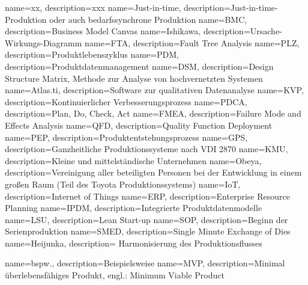 %
{
  name=xx, 
  description={xxx}
}
%
%
{
  name=Just-in-time, 
  description={Just-in-time-Produktion oder auch bedarfssynchrone Produktion}
}
%
%
{
  name=BMC, 
  description={Business Model Canvas}
}
%
%
{
  name=Ishikawa, 
  description={Ursache-Wirkungs-Diagramm}
}
%
%
{
  name=FTA, 
  description={Fault Tree Analysis}
}
%
%
{
  name=PLZ, 
  description={Produktlebenszyklus}
}
%
%
{
  name=PDM, 
  description={Produktdatenmanagement}
}
%
%
{
  name=DSM, 
  description={Design Structure Matrix, Methode zur Analyse von hochvernetzten Systemen}
}
%
%
{
  name=Atlas.ti, 
  description={Software zur qualitativen Datenanalyse}
}
%
%
{
  name=KVP, 
  description={Kontinuierlicher Verbesserungsprozess}
}
%
%
{
  name=PDCA, 
  description={Plan, Do, Check, Act}
}
%
%
{
  name=FMEA, 
  description={Failure Mode and Effects Analysis}%
}
%
%
{
  name=QFD, 
  description={Quality Function Deployment}%
}
%
%
{
  name=PEP, 
  description={Produktentstehungsprozess}
}
%
%
{
  name=GPS, 
  description={Ganzheitliche Produktionssysteme nach VDI 2870}
}
%
%
{
  name=KMU, 
  description={Kleine und mittelständische Unternehmen}
}
%
%
{
  name=Obeya, 
  description={Vereinigung aller beteiligten Personen bei der Entwicklung in einem großen Raum (Teil des Toyota Produktionssystems)}
}
%
{
  name=IoT, 
  description={Internet of Things}
}
%
%
{
  name=ERP, 
  description={Enterprise Resource Planning}
}
%
{
  name=IPDM, 
  description={Integrierte Produktdatenmodelle}
}
%
{
  name=LSU, 
  description={Lean Start-up}
}
%
{
  name=SOP, 
  description={Beginn der Serienproduktion}
}
%
{
  name=SMED, 
  description={Single Minute Exchange of Dies}%
}
%
{
  name=Heijunka, 
  description={
Harmonisierung des Produktionsflusses}
}

{
  name=bspw.,
  description={Beispielsweise}
}
%
{  
  name=MVP,
  description={Minimal überlebensfähiges Produkt, engl.: Minimum Viable
Product}
}
